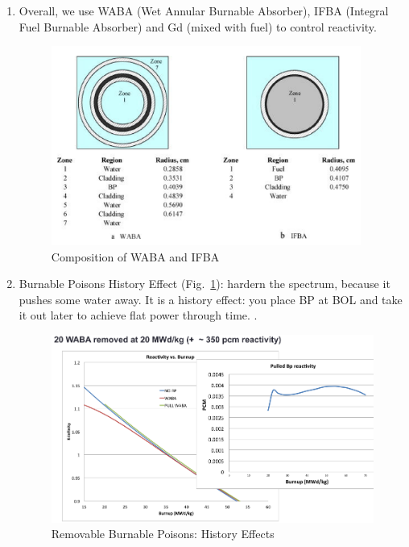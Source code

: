 \documentclass{school-22.211-notes}
\begin{document}
\clearpage
{}
\begin{enumerate}
\item Overall, we use WABA (Wet Annular Burnable Absorber), IFBA
  (Integral Fuel Burnable Absorber) and Gd (mixed with fuel) to
  control reactivity.
  \begin{figure}
    \centering
    \includegraphics[width=4in]{images/dfs/WABA-IFBA.png}
    \caption{Composition of WABA and IFBA} 
  \end{figure}

\item Burnable Poisons History Effect (Fig.~\ref{BP-history-effect}):
  hardern the spectrum, because it pushes some water away. It is a
  history effect: you place BP at BOL and take it out later to achieve
  flat power through time. .
  \begin{figure}
    \centering
    \includegraphics[width=5in]{images/dfs/BP-history-effect.png}
    \caption{Removable Burnable Poisons: History Effects}  \label{BP-history-effect}
  \end{figure}



\end{enumerate}
\end{document}
